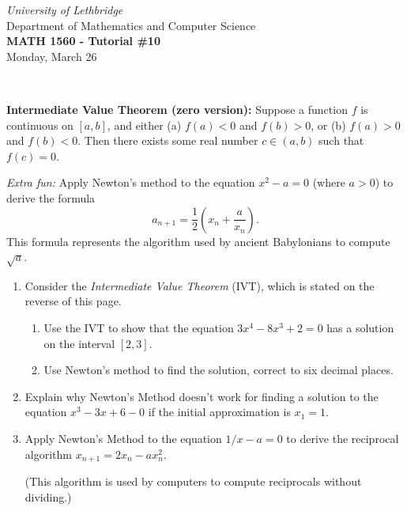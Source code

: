 \documentclass[12pt]{article}
\newcommand{\skipline}{\vspace{12pt}}
\begin{document}
\author{Instructor: Sean Fitzpatrick}
\thispagestyle{empty}
\begin{center}
\emph{University of Lethbridge}\\
Department of Mathematics and Computer Science\\
{\bf MATH 1560 - Tutorial \#10}\\
Monday, March 26
\end{center}
\skipline \ \noindent \skipline

\vspace*{\fill}

\textbf{Intermediate Value Theorem (zero version):} Suppose a function $f$ is continuous on $[a,b]$, and either (a) $f(a)<0$ and $f(b)>0$, or (b) $f(a)>0$ and $f(b)<0$. Then there exists some real number $c\in (a,b)$ such that $f(c)=0$.

\bigskip

\textit{Extra fun:} Apply Newton's method to the equation $x^2-a=0$ (where $a>0$) to derive the formula
\[
a_{n+1} = \frac12\left(x_n+\frac{a}{x_n}\right).
\]
This formula represents the algorithm used by ancient Babylonians to compute $\sqrt{a}$.

\newpage


\begin{enumerate}
\item Consider the \textit{Intermediate Value Theorem} (IVT), which is stated on the reverse of this page.
\begin{enumerate}
\item Use the IVT to show that the equation $3x^4-8x^3+2=0$ has a solution on the interval $[2,3]$.

\vspace{1in}

\item Use Newton's method to find the solution, correct to six decimal places.

\end{enumerate}

\vspace{2.5in}

\item Explain why Newton's Method doesn't work for finding a solution to the equation $x^3-3x+6-0$ if the initial approximation is $x_1=1$.

\vspace{1in}

\item Apply Newton's Method to the equation $1/x - a=0$ to derive the reciprocal algorithm $x_{n+1}=2x_n-ax_n^2$.

(This algorithm is used by computers to compute reciprocals without dividing.)
\end{enumerate}
\end{document}
